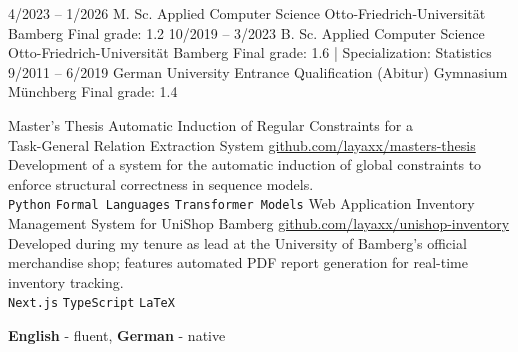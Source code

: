 \documentclass[9pt]{developercv} %
\begin{document}
\vspace{-10 pt}
\begin{entrylist}
	\entry
	{4/2023 -- 1/2026}
	{M. Sc. Applied Computer Science}
	{Otto-Friedrich-Universität Bamberg}
	{Final grade: 1.2}
	\entry
	{10/2019 -- 3/2023}
	{B. Sc. Applied Computer Science}
	{Otto-Friedrich-Universität Bamberg}
	{Final grade: 1.6 | Specialization: Statistics}
	\entry
	{9/2011 -- 6/2019}
	{German University Entrance Qualification (Abitur)}
	{Gymnasium Münchberg}
	{Final grade: 1.4}
\end{entrylist}

\vspace{-10 pt}
\begin{entrylist}
	\entry
	{Master's Thesis}
	{Automatic Induction of Regular Constraints for a\\ Task-General Relation Extraction System}
	{\href{https://github.com/layaxx/masters-thesis}{github.com/layaxx/masters-thesis}}
	{Development of a system for the automatic induction of global constraints to enforce structural correctness in sequence models.\\
		\texttt{Python} \slashsep \texttt{Formal Languages} \slashsep \texttt{Transformer Models}}
	\entry
	{Web Application}
	{Inventory Management System for UniShop Bamberg}
	{\href{https://github.com/layaxx/unishop-inventory}{github.com/layaxx/unishop-inventory}}
	{Developed during my tenure as lead at the University of Bamberg's official merchandise shop; features automated PDF report generation for real-time inventory tracking.\\
		\texttt{Next.js} \slashsep \texttt{TypeScript} \slashsep \texttt{LaTeX}}
\end{entrylist}
\vspace{-10 pt}
\vspace{-6pt}

\hspace{26mm} \textbf{English} - fluent, \textbf{ German} - native

\end{document}
